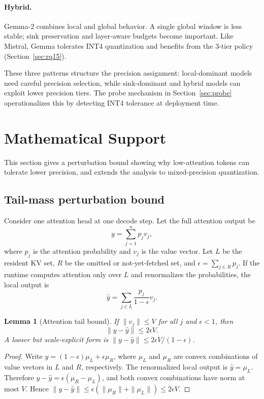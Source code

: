 \documentclass[11pt]{article}
\theoremstyle{definition}
\theoremstyle{plain}
\newtheorem{lemma}{Lemma}
\begin{document}
\paragraph{Hybrid.} Gemma-2 combines local and global behavior.  A single global window is less stable; sink preservation and layer-aware budgets become important.  Like Mistral, Gemma tolerates INT4 quantization and benefits from the 3-tier policy (Section~\ref{sec:rq15}).

These three patterns structure the precision assignment: local-dominant models need careful precision selection, while sink-dominant and hybrid models can exploit lower precision tiers.  The probe mechanism in Section~\ref{sec:probe} operationalizes this by detecting INT4 tolerance at deployment time.

\section{Mathematical Support}
\label{sec:theory}

This section gives a perturbation bound showing why low-attention tokens can tolerate lower precision, and extends the analysis to mixed-precision quantization.

\subsection{Tail-mass perturbation bound}
Consider one attention head at one decode step.  Let the full attention output be
\begin{equation}
  y = \sum_{j=1}^{n} p_j v_j,
\end{equation}
where $p_j$ is the attention probability and $v_j$ is the value vector.  Let $L$ be the resident KV set, $R$ be the omitted or not-yet-fetched set, and $\epsilon=\sum_{j\in R}p_j$.  If the runtime computes attention only over $L$ and renormalizes the probabilities, the local output is
\begin{equation}
  \hat{y}=\sum_{j\in L}\frac{p_j}{1-\epsilon}v_j.
\end{equation}

\begin{lemma}[Attention tail bound]
If $\|v_j\|\le V$ for all $j$ and $\epsilon<1$, then
\begin{equation}
  \|y-\hat{y}\| \le 2\epsilon V.
\end{equation}
A looser but scale-explicit form is $\|y-\hat{y}\|\le 2\epsilon V/(1-\epsilon)$.
\end{lemma}
\begin{proof}
Write $y=(1-\epsilon)\mu_L+\epsilon\mu_R$, where $\mu_L$ and $\mu_R$ are convex combinations of value vectors in $L$ and $R$, respectively.  The renormalized local output is $\hat{y}=\mu_L$.  Therefore $y-\hat{y}=\epsilon(\mu_R-\mu_L)$, and both convex combinations have norm at most $V$.  Hence $\|y-\hat{y}\|\le \epsilon(\|\mu_R\|+\|\mu_L\|)\le2\epsilon V$.
\end{proof}
\end{document}
